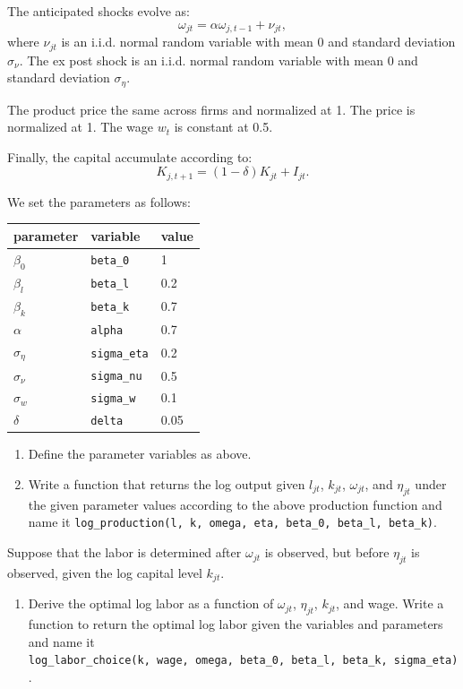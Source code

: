 \documentclass[]{book}
\providecommand{\tightlist}{%
  \setlength{\itemsep}{0pt}\setlength{\parskip}{0pt}}
\begin{document}
The anticipated shocks evolve as: \[
\omega_{jt} = \alpha \omega_{j, t - 1} + \nu_{jt},
\] where \(\nu_{jt}\) is an i.i.d. normal random variable with mean 0
and standard deviation \(\sigma_\nu\). The ex post shock is an i.i.d.
normal random variable with mean 0 and standard deviation
\(\sigma_{\eta}\).

The product price the same across firms and normalized at 1. The price
is normalized at 1. The wage \(w_t\) is constant at 0.5.

Finally, the capital accumulate according to: \[
K_{j, t + 1} = (1 - \delta) K_{jt} + I_{jt}.
\]

We set the parameters as follows:

\begin{longtable}[]{@{}lll@{}}
\toprule
parameter & variable & value\tabularnewline
\midrule
\endhead
\(\beta_0\) & \texttt{beta\_0} & 1\tabularnewline
\(\beta_l\) & \texttt{beta\_l} & 0.2\tabularnewline
\(\beta_k\) & \texttt{beta\_k} & 0.7\tabularnewline
\(\alpha\) & \texttt{alpha} & 0.7\tabularnewline
\(\sigma_{\eta}\) & \texttt{sigma\_eta} & 0.2\tabularnewline
\(\sigma_{\nu}\) & \texttt{sigma\_nu} & 0.5\tabularnewline
\(\sigma_{w}\) & \texttt{sigma\_w} & 0.1\tabularnewline
\(\delta\) & \texttt{delta} & 0.05\tabularnewline
\bottomrule
\end{longtable}

\begin{enumerate}
\def\labelenumi{\arabic{enumi}.}
\item
  Define the parameter variables as above.
\item
  Write a function that returns the log output given \(l_{jt}\),
  \(k_{jt}\), \(\omega_{jt}\), and \(\eta_{jt}\) under the given
  parameter values according to the above production function and name
  it
  \texttt{log\_production(l,\ k,\ omega,\ eta,\ beta\_0,\ beta\_l,\ beta\_k)}.
\end{enumerate}

Suppose that the labor is determined after \(\omega_{jt}\) is observed,
but before \(\eta_{jt}\) is observed, given the log capital level
\(k_{jt}\).

\begin{enumerate}
\def\labelenumi{\arabic{enumi}.}
\setcounter{enumi}{2}
\tightlist
\item
  Derive the optimal log labor as a function of \(\omega_{jt}\),
  \(\eta_{jt}\), \(k_{jt}\), and wage. Write a function to return the
  optimal log labor given the variables and parameters and name it
  \texttt{log\_labor\_choice(k,\ wage,\ omega,\ beta\_0,\ beta\_l,\ beta\_k,\ sigma\_eta)}.
\end{enumerate}
\end{document}
